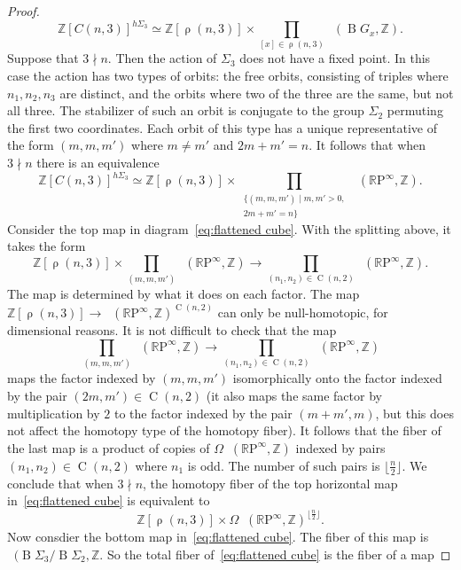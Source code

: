 \documentclass[10pt,a4paper]{amsart}
\DeclareMathOperator{\Comp}{C}
\DeclareMathOperator{\Part}{\rho}
\newcommand{\RP}{\mathbb{R}\mathrm{P}}
\newcommand{\Z}{\mathbb{Z}}
\newcommand{\classifying}{\operatorname{B}}
\DeclareMathOperator{\map}{Map}
\DeclareMathOperator{\pointedmaps}{\map_*}
\begin{document}
\begin{proof}
\[
\Z[C(n, 3)]^{h\Sigma_3} \simeq \Z[\Part(n, 3)]\times \prod_{[x]\in \Part(n, 3)}\pointedmaps (\classifying {G_x},\Z).
\]
Suppose that $3\nmid n$. Then the action of $\Sigma_3$ does not have a fixed point. In this case the action has two types of orbits: the free orbits, consisting of triples where $n_1, n_2, n_3$ are distinct, and the orbits where two of the three are the same, but not all three. The stabilizer of such an orbit is conjugate to the group $\Sigma_2$ permuting the first two coordinates. Each orbit of this type has a unique representative of the form $(m,m,m')$ where $m\ne m'$ and $2m+m'=n$. %
It follows that when $3\nmid n$ there is an equivalence
\[
\Z[C(n, 3)]^{h\Sigma_3} \simeq \Z[\Part(n, 3)]\times \prod_{\begin{array}{c}{\{(m, m, m')\mid m, m'>0,} \\ {  2m+m'=n\}}\end{array}}\pointedmaps (\RP^\infty,\Z).
\]
Consider the top map in diagram~\eqref{eq:flattened cube}. With the splitting above, it takes the form
\[
\Z[\Part(n, 3)]\times \prod_{(m, m, m')}\pointedmaps (\RP^\infty,\Z)\to \prod_{(n_1, n_2)\in \Comp(n, 2)}\pointedmaps(\RP^\infty, \Z).
\]
The map is determined by what it does on each factor. The map $\Z[\Part(n, 3)]\to \pointedmaps(\RP^\infty, \Z)^{\Comp(n, 2)}$ can only be null-homotopic, for dimensional reasons. It is not difficult to check that the map 
\[\prod_{(m, m, m')}\pointedmaps (\RP^\infty,\Z) \to \prod_{(n_1, n_2)\in \Comp(n, 2)} \pointedmaps(\RP^\infty, \Z)
\] 
maps the factor indexed by $(m,m,m')$ isomorphically onto the factor indexed by the pair $(2m, m')\in \Comp(n, 2)$ (it also maps the same factor by multiplication by $2$ to the factor indexed by the pair $(m+m', m)$, but this does not affect the homotopy type of the homotopy fiber). It follows that the fiber of the last map is a product of copies of $\Omega  \pointedmaps(\RP^\infty, \Z)$ indexed by pairs $(n_1, n_2)\in \Comp(n, 2)$ where $n_1$ is odd. The number of such pairs is $\lfloor\frac{n}{2}\rfloor$. We conclude that when $3\nmid n$, the homotopy fiber of the top horizontal map in~\eqref{eq:flattened cube} is equivalent to 
\[
\Z[\Part(n, 3)]\times \Omega \pointedmaps(\RP^\infty, \Z)^{\lfloor\frac{n}{2}\rfloor}.
\]
Now consdier the bottom map in~\eqref{eq:flattened cube}. The fiber of this map is $\pointedmaps(\classifying\Sigma_3/\classifying\Sigma_2, \Z$. So the total fiber of~\eqref{eq:flattened cube} is the fiber of a map

\end{proof}
\end{document}
